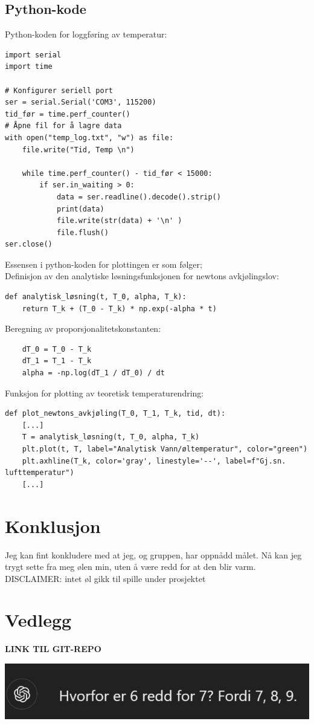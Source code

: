 \documentclass{article}
\begin{document}
\subsection{Python-kode}
Python-koden for loggføring av temperatur:
\begin{verbatim}
import serial
import time

# Konfigurer seriell port
ser = serial.Serial('COM3', 115200)
tid_før = time.perf_counter()
# Åpne fil for å lagre data
with open("temp_log.txt", "w") as file:
    file.write("Tid, Temp \n")

    while time.perf_counter() - tid_før < 15000:
        if ser.in_waiting > 0:
            data = ser.readline().decode().strip()
            print(data)
            file.write(str(data) + '\n' )
            file.flush()
ser.close()
\end{verbatim}
Essensen i python-koden for plottingen er som følger;\\
Definisjon av den analytiske løsningsfunksjonen for newtons avkjølingslov:
\begin{verbatim}
def analytisk_løsning(t, T_0, alpha, T_k):
    return T_k + (T_0 - T_k) * np.exp(-alpha * t)
\end{verbatim}
Beregning av proporsjonalitetskonstanten:
\begin{verbatim}
    dT_0 = T_0 - T_k
    dT_1 = T_1 - T_k
    alpha = -np.log(dT_1 / dT_0) / dt
\end{verbatim}
Funksjon for plotting av teoretisk temperaturendring:
\begin{verbatim}
def plot_newtons_avkjøling(T_0, T_1, T_k, tid, dt): 
    [...]
    T = analytisk_løsning(t, T_0, alpha, T_k)
    plt.plot(t, T, label="Analytisk Vann/øltemperatur", color="green")
    plt.axhline(T_k, color='gray', linestyle='--', label=f"Gj.sn. lufttemperatur")
    [...]
\end{verbatim}

\section{Konklusjon}
Jeg kan fint konkludere med at jeg, og gruppen, har oppnådd målet. Nå kan jeg trygt sette fra meg ølen min, uten å være redd for at den blir varm.
\vfill
DISCLAIMER: intet øl gikk til spille under prosjektet

\section*{Vedlegg}
\textbf{LINK TIL GIT-REPO}
\begin{center}
    \includegraphics{GPT_math_joke.png}
\end{center}
\end{document}
